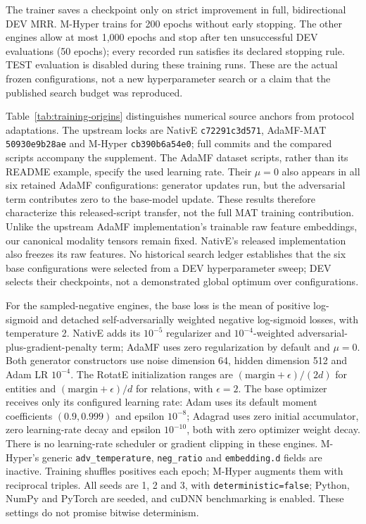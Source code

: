 \documentclass[11pt,a4paper]{article}
\begin{document}
The trainer saves a checkpoint only on strict improvement in full, bidirectional DEV MRR. M-Hyper trains for 200 epochs without early stopping. The other engines allow at most 1,000 epochs and stop after ten unsuccessful DEV evaluations (50 epochs); every recorded run satisfies its declared stopping rule. TEST evaluation is disabled during these training runs. These are the actual frozen configurations, not a new hyperparameter search or a claim that the published search budget was reproduced.


Table~\ref{tab:training-origins} distinguishes numerical source anchors from protocol adaptations. The upstream locks are NativE \texttt{c72291c3d571}, AdaMF-MAT \texttt{50930e9b28ae} and M-Hyper \texttt{cb390b6a54e0}; full commits and the compared scripts accompany the supplement. The AdaMF dataset scripts, rather than its README example, specify the used learning rate. Their $\mu=0$ also appears in all six retained AdaMF configurations: generator updates run, but the adversarial term contributes zero to the base-model update. These results therefore characterize this released-script transfer, not the full MAT training contribution. Unlike the upstream AdaMF implementation's trainable raw feature embeddings, our canonical modality tensors remain fixed. NativE's released implementation also freezes its raw features. No historical search ledger establishes that the six base configurations were selected from a DEV hyperparameter sweep; DEV selects their checkpoints, not a demonstrated global optimum over configurations.

For the sampled-negative engines, the base loss is the mean of positive log-sigmoid and detached self-adversarially weighted negative log-sigmoid losses, with temperature 2. NativE adds its $10^{-5}$ regularizer and $10^{-4}$-weighted adversarial-plus-gradient-penalty term; AdaMF uses zero regularization by default and $\mu=0$. Both generator constructors use noise dimension 64, hidden dimension 512 and Adam LR $10^{-4}$. The RotatE initialization ranges are $(\mathrm{margin}+\epsilon)/(2d)$ for entities and $(\mathrm{margin}+\epsilon)/d$ for relations, with $\epsilon=2$. The base optimizer receives only its configured learning rate: Adam uses its default moment coefficients $(0.9,0.999)$ and epsilon $10^{-8}$; Adagrad uses zero initial accumulator, zero learning-rate decay and epsilon $10^{-10}$, both with zero optimizer weight decay. There is no learning-rate scheduler or gradient clipping in these engines. M-Hyper's generic \texttt{adv\_temperature}, \texttt{neg\_ratio} and \texttt{embedding.d} fields are inactive. Training shuffles positives each epoch; M-Hyper augments them with reciprocal triples. All seeds are 1, 2 and 3, with \texttt{deterministic=false}; Python, NumPy and PyTorch are seeded, and cuDNN benchmarking is enabled. These settings do not promise bitwise determinism.
\end{document}
